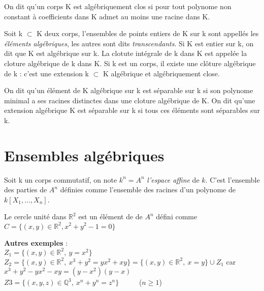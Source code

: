 \documentclass[a4paper,10pt]{article}
\begin{document}
On dit qu'un corps K est algébriquement clos si pour tout polynome non constant à coefficients dans K admet au moins une racine dans K.

Soit k $ \subset $ K deux corps, l'ensembles de points entiers de K sur k sont appellés les \textit{éléments algébriques}, les autres sont dits \textit{transcendants}. Si K est entier sur k, on dit que K est algébrique sur k. La clotute intégrale de k dans K est appelée la cloture algébrique de k dans K. Si k est un corps, il existe une clôture algébrique de k :
c’est une extension k $\subset$ K algébrique et algébriquement close.

On dit qu'un élément de K algébrique sur k est séparable sur k si son polynome minimal a ses  racines distinctes dans une cloture algébrique de K. On dit qu'une extension algébrique K est séparable sur k si tous ces éléments sont séparables sur k.



\section{Ensembles algébriques}

Soit k un corps commutatif, on note $k^{n} = A^{n}$ \textit{l'espace affine} de $k$. C'est l'ensemble des parties de $A^{n}$ définies comme l'ensemble des racines d'un polynome de $k[X_{1},...,X_{n}]$.

Le cercle unité dans $\mathbb{R}^{2}$ est un élément de de $A^{n}$ défini comme $C= \{(x,y) \in \mathbb{R}^{2} , x^{2} + y^{2} - 1 = 0 \} $ 


\centering
{}


\flushleft \textbf{Autres exemples} :\\
 $Z_{1}=\{(x,y) \in \mathbb{R}^{2},\ y = x^{2}  \}$\\
 $Z_{2} = \{(x,y) \in \mathbb{R} ^{2}, \ x^{3} +  y^{2} = yx^{2} + xy \}  = \{(x,y) \in \mathbb{R} ^{2}, \ x = y\} \cup Z_{1}$  car \ $x^{3} + y^{2} - yx^{2} - xy = (y-x^{2})(y-x) $
\\ $ Z{3} =\{(x,y,z) \in \mathbb{Q}^{3},\ x^{n} + y^{n} = z^{n}\} $   \ \ \ \ \ ($n\geq 1 $)
\end{document}

